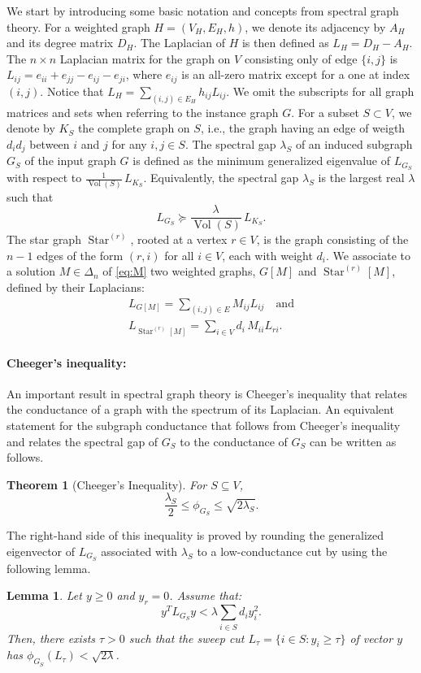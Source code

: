 \documentclass{article}
\newtheorem{theorem}{Theorem}[section]
\newtheorem{lemma}{Lemma}[section]
\DeclareMathOperator{\Tr}{Tr}
\DeclareMathOperator{\Vol}{Vol}
\DeclareMathOperator{\Star}{Star}
\begin{document}
We start by introducing some basic notation and concepts from spectral graph theory. For a weighted graph $H = (V_H, E_H, h)$, we denote its adjacency by $A_H$ and its degree matrix $D_H$. The Laplacian of $H$ is then defined as $L_H = D_H - A_H$. The $n \times n$ Laplacian matrix for the graph on $V$ consisting only of edge $\{i,j\}$ is $L_{ij} = e_{ii} + e_{jj} - e_{ij} - e_{ji}$,  where $e_{ij}$ is an all-zero matrix except for a one at index $(i,j)$. Notice that $L_H = \sum_{(i,j) \in E_H} h_{ij} L_{ij}$. We omit the subscripts for all graph matrices and sets when referring to the instance graph $G$.
%
For a subset $S \subset V$, we denote by $K_S$ the complete graph on $S$, i.e., the graph having an edge of weigth $d_i d_j$ between $i$ and $j$ for any $i,j \in S$.  
%
The spectral gap $\lambda_S$ of an induced subgraph $G_S$ of the input graph $G$ is defined as the minimum generalized eigenvalue of $ L_{G_S}$ with respect to $\frac{1}{\Vol(S)} \, L_{K_S}$. Equivalently, the spectral gap $\lambda_S$ is the largest real $\lambda$ such that
\[ L_{G_S} \succeq \frac{\lambda}{\Vol(S)} \, L_{K_S}. \]
The star graph $\Star^{(r)}$, rooted at a vertex $r \in V$, is the graph consisting of the $n-1$ edges of the form $(r,i)$ for all $i \in V$, each with weight $d_i$. We associate to a solution $M \in \Delta_n$ of \eqref{eq:M} two weighted graphs, $G[M]$ and $\Star^{(r)}[M]$, defined by their Laplacians:
\begin{eqnarray*}
L_{G[M]} = \sum_{(i,j)\in E} M_{ij} L_{ij} \quad \textrm{and}\\
L_{\Star^{(r)}[M]} = \sum_{i \in V} d_i \,  M_{ii} L_{ri}.
\end{eqnarray*}

\paragraph{Cheeger's inequality:}
An important result in spectral graph theory is Cheeger's inequality \cite{chung} that relates the conductance of a graph with the spectrum of its Laplacian. An equivalent statement for the subgraph conductance that follows from Cheeger's inequality and relates the spectral gap of $G_S$ to the conductance of $G_S$ can be written as follows.
\begin{theorem}[Cheeger's Inequality] 
For $S \subseteq V$,
\[ \frac{\lambda_S}{2} \leq \phi_{G_S} \leq \sqrt{2 \lambda_S}. \]
\end{theorem}
The right-hand side of this inequality is proved by rounding the generalized eigenvector of $L_{G_S}$ associated with $\lambda_S$ to a low-conductance cut by using the following lemma.
\begin{lemma}\label{lem:cheeger-rounding}
  Let $y \geq 0$ and $y_r = 0$. Assume that:
  \[ y^T L_{G_S} y < \lambda \sum_{i \in S} d_i y_i^2. \]
  Then, there exists $\tau > 0$ such that the sweep cut $L_{\tau} = \{i \in S : y_i \geq \tau \}$ of vector $y$ has $\phi_{G_S}(L_{\tau}) < \sqrt{2 \lambda}$.
\end{lemma}
\end{document}
